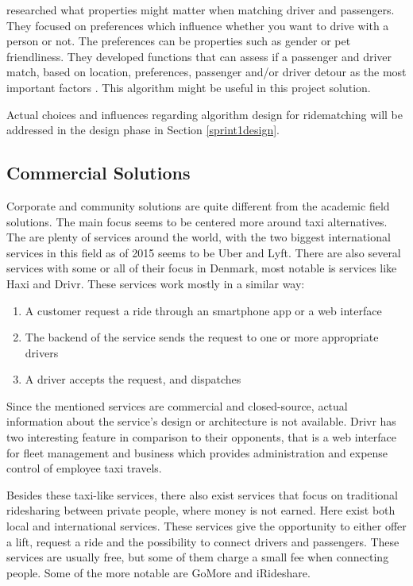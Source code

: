 \citet{ghoseiri2011real} researched what properties might matter when matching driver and passengers.
They focused on preferences which influence whether you want to drive with a person or not. The preferences can be properties such as gender or pet friendliness.
They developed functions that can assess if a passenger and driver match, based on location, preferences, passenger and/or driver detour as the most important factors \cite{ghoseiri2011real}.
This algorithm might be useful in this project solution.

Actual choices and influences regarding algorithm design for ridematching will be addressed in the design phase in Section \ref{sprint1design}.

\subsection{Commercial Solutions}
Corporate and community solutions are quite different from the academic field solutions.
The main focus seems to be centered more around taxi alternatives.
The are plenty of services around the world, with the two biggest international services in this field as of 2015 seems to be Uber and Lyft\cite{ridehail}.
There are also several services with some or all of their focus in Denmark, most notable is services like Haxi and Drivr.
These services work mostly in a similar way: 

\begin{enumerate}
	\item A customer request a ride through an smartphone app or a web interface
	\item The backend of the service sends the request to one or more appropriate drivers
	\item A driver accepts the request, and dispatches
\end{enumerate}

Since the mentioned services are commercial and closed-source, actual information about the service's design or architecture is not available.
Drivr has two interesting feature in comparison to their opponents, that is a web interface for fleet management and business which provides administration and expense control of employee taxi travels.

Besides these taxi-like services, there also exist services that focus on traditional ridesharing between private people, where money is not earned.
Here exist both local and international services. 
These services give the opportunity to either offer a lift, request a ride and the possibility to connect drivers and passengers.
These services are usually free, but some of them charge a small fee when connecting people.
Some of the more notable are GoMore and iRideshare.

